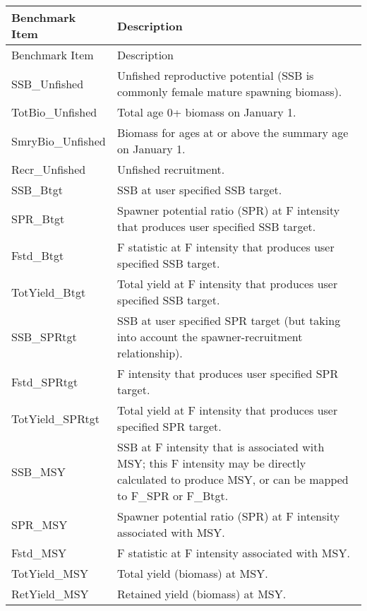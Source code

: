 \begin{center}
	\begin{longtable}{p{4cm} p{11cm}}
		\hline
		Benchmark Item & Description \Tstrut\Bstrut\\
		\hline
		\endfirsthead

		\hline
		Benchmark Item & Description \Tstrut\Bstrut\\
		\hline
		\endhead
		
		\endfoot
		\hline		
		\endlastfoot
		
		SSB\_Unfished \Tstrut & Unfished reproductive potential (SSB is commonly female mature spawning biomass). \\
		TotBio\_Unfished \Tstrut & Total age 0+ biomass on January 1. \\
		SmryBio\_Unfished \Tstrut & Biomass for ages at or above the summary age on January 1. \\
		Recr\_Unfished \Tstrut & Unfished recruitment. \\
		SSB\_Btgt \Tstrut & SSB at user specified SSB target. \\
		SPR\_Btgt \Tstrut & Spawner potential ratio (SPR) at F intensity that produces user specified SSB target. \\
		Fstd\_Btgt \Tstrut & F statistic at F intensity that produces user specified SSB target. \\
		TotYield\_Btgt \Tstrut & Total yield at F intensity that produces user specified SSB target. \\
		SSB\_SPRtgt \Tstrut & SSB at user specified SPR target (but taking into account the spawner-recruitment relationship). \\
		Fstd\_SPRtgt \Tstrut & F intensity that produces user specified SPR target. \\
		TotYield\_SPRtgt \Tstrut & Total yield at F intensity that produces user specified SPR target. \\
		SSB\_MSY \Tstrut & SSB at F intensity that is associated with MSY; this F intensity may be directly calculated to produce MSY, or can be mapped to F\_SPR or F\_Btgt. \\
		SPR\_MSY \Tstrut & Spawner potential ratio (SPR) at F intensity associated with MSY. \\
		Fstd\_MSY \Tstrut & F statistic at F intensity associated with MSY. \\
		TotYield\_MSY \Tstrut & Total yield (biomass) at MSY. \\
		RetYield\_MSY \Tstrut & Retained yield (biomass) at MSY. \Bstrut\\ 
	\end{longtable}
\end{center}

